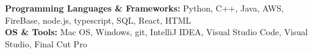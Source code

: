 

\begin{cvparagraph}

\textbf{Programming Languages \& Frameworks:}  Python, C++, Java, AWS, FireBase, node.js, typescript, SQL, React, HTML
\\[2pt]
\textbf{OS \& Tools:} Mac OS, Windows, git, IntelliJ IDEA, Visual Studio Code, Visual Studio, Final Cut Pro


\end{cvparagraph}
